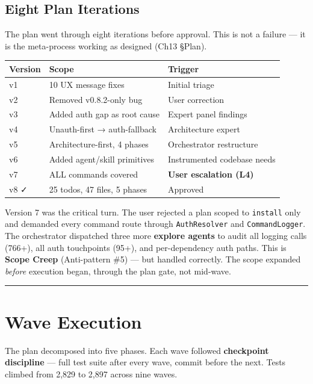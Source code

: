 \documentclass[
  a4paper,
  DIV=11,
  numbers=noendperiod]{scrreprt}
\newcounter{none} %
\begin{document}
\subsection{Eight Plan Iterations}\label{eight-plan-iterations}

The plan went through eight iterations before approval. This is not a
failure --- it is the meta-process working as designed (Ch13 §Plan).

{\def\LTcaptype{none} %
\begin{longtable}[]{@{}lll@{}}
\toprule\noalign{}
Version & Scope & Trigger \\
\midrule\noalign{}
\endhead
\bottomrule\noalign{}
\endlastfoot
v1 & 10 UX message fixes & Initial triage \\
v2 & Removed v0.8.2-only bug & User correction \\
v3 & Added auth gap as root cause & Expert panel findings \\
v4 & Unauth-first → auth-fallback & Architecture expert \\
v5 & Architecture-first, 4 phases & Orchestrator restructure \\
v6 & Added agent/skill primitives & Instrumented codebase needs \\
v7 & ALL commands covered & \textbf{User escalation (L4)} \\
v8 ✓ & 25 todos, 47 files, 5 phases & Approved \\
\end{longtable}
}

Version 7 was the critical turn. The user rejected a plan scoped to
\texttt{install} only and demanded every command route through
\texttt{AuthResolver} and \texttt{CommandLogger}. The orchestrator
dispatched three more \textbf{explore agents} to audit all logging calls
(766+), all auth touchpoints (95+), and per-dependency auth paths. This
is \textbf{Scope Creep} (Anti-pattern \#5) --- but handled correctly.
The scope expanded \emph{before} execution began, through the plan gate,
not mid-wave.

\begin{center}\rule{0.5\linewidth}{0.5pt}\end{center}

\section{Wave Execution}\label{wave-execution}

The plan decomposed into five phases. Each wave followed
\textbf{checkpoint discipline} --- full test suite after every wave,
commit before the next. Tests climbed from 2,829 to 2,897 across nine
waves.
\end{document}
